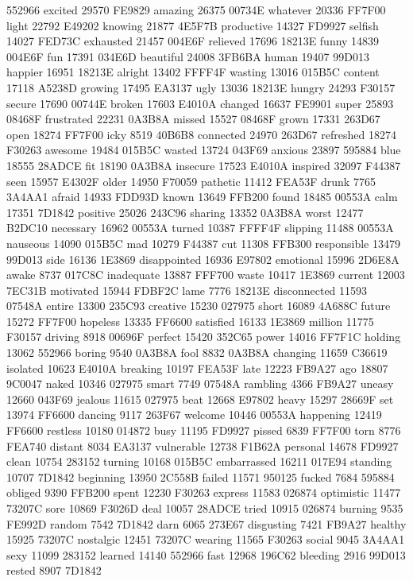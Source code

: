 552966 excited 29570 FE9829 amazing 26375 00734E whatever 20336 FF7F00
light 22792 E49202 knowing 21877 4E5F7B productive 14327 FD9927 selfish
14027 FED73C exhausted 21457 004E6F relieved 17696 18213E funny 14839
004E6F fun 17391 034E6D beautiful 24008 3FB6BA human 19407 99D013
happier 16951 18213E alright 13402 FFFF4F wasting 13016 015B5C content
17118 A5238D growing 17495 EA3137 ugly 13036 18213E hungry 24293 F30157
secure 17690 00744E broken 17603 E4010A changed 16637 FE9901 super
25893 08468F frustrated 22231 0A3B8A missed 15527 08468F grown 17331
263D67 open 18274 FF7F00 icky 8519 40B6B8 connected 24970 263D67
refreshed 18274 F30263 awesome 19484 015B5C wasted 13724 043F69 anxious
23897 595884 blue 18555 28ADCE fit 18190 0A3B8A insecure 17523 E4010A
inspired 32097 F44387 seen 15957 E4302F older 14950 F70059 pathetic
11412 FEA53F drunk 7765 3A4AA1 afraid 14933 FDD93D known 13649 FFB200
found 18485 00553A calm 17351 7D1842 positive 25026 243C96 sharing
13352 0A3B8A worst 12477 B2DC10 necessary 16962 00553A turned 10387
FFFF4F slipping 11488 00553A nauseous 14090 015B5C mad 10279 F44387 cut
11308 FFB300 responsible 13479 99D013 side 16136 1E3869 disappointed
16936 E97802 emotional 15996 2D6E8A awake 8737 017C8C inadequate 13887
FFF700 waste 10417 1E3869 current 12003 7EC31B motivated 15944 FDBF2C
lame 7776 18213E disconnected 11593 07548A entire 13300 235C93 creative
15230 027975 short 16089 4A688C future 15272 FF7F00 hopeless 13335
FF6600 satisfied 16133 1E3869 million 11775 F30157 driving 8918 00696F
perfect 15420 352C65 power 14016 FF7F1C holding 13062 552966 boring
9540 0A3B8A fool 8832 0A3B8A changing 11659 C36619 isolated 10623
E4010A breaking 10197 FEA53F late 12223 FB9A27 ago 18807 9C0047 naked
10346 027975 smart 7749 07548A rambling 4366 FB9A27 uneasy 12660 043F69
jealous 11615 027975 beat 12668 E97802 heavy 15297 28669F set 13974
FF6600 dancing 9117 263F67 welcome 10446 00553A happening 12419 FF6600
restless 10180 014872 busy 11195 FD9927 pissed 6839 FF7F00 torn 8776
FEA740 distant 8034 EA3137 vulnerable 12738 F1B62A personal 14678
FD9927 clean 10754 283152 turning 10168 015B5C embarrassed 16211 017E94
standing 10707 7D1842 beginning 13950 2C558B failed 11571 950125 fucked
7684 595884 obliged 9390 FFB200 spent 12230 F30263 express 11583 026874
optimistic 11477 73207C sore 10869 F3026D deal 10057 28ADCE tried 10915
026874 burning 9535 FE992D random 7542 7D1842 darn 6065 273E67
disgusting 7421 FB9A27 healthy 15925 73207C nostalgic 12451 73207C
wearing 11565 F30263 social 9045 3A4AA1 sexy 11099 283152 learned 14140
552966 fast 12968 196C62 bleeding 2916 99D013 rested 8907 7D1842
